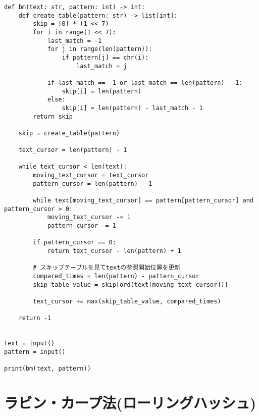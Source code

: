 \documentclass{jlreq}
\begin{document}
\begin{lstlisting}[caption=BM法の実装, frame=TRBL, label={BM}]
def bm(text: str, pattern: int) -> int:
	def create_table(pattern: str) -> list[int]:
		skip = [0] * (1 << 7)
		for i in range(1 << 7):
			last_match = -1
			for j in range(len(pattern)):
				if pattern[j] == chr(i):
					last_match = j
			
			if last_match == -1 or last_match == len(pattern) - 1:
				skip[i] = len(pattern)
			else:
				skip[i] = len(pattern) - last_match - 1
		return skip

	skip = create_table(pattern)

	text_cursor = len(pattern) - 1
	
	while text_cursor < len(text):
		moving_text_cursor = text_cursor
		pattern_cursor = len(pattern) - 1
  
		while text[moving_text_cursor] == pattern[pattern_cursor] and pattern_cursor > 0:
			moving_text_cursor -= 1
			pattern_cursor -= 1
   
		if pattern_cursor == 0:
			return text_cursor - len(pattern) + 1
		
		# スキップテーブルを見てtextの参照開始位置を更新
		compared_times = len(pattern) - pattern_cursor
		skip_table_value = skip[ord(text[moving_text_cursor])]
  
		text_cursor += max(skip_table_value, compared_times)
	
	return -1
  
  
text = input()
pattern = input()

print(bm(text, pattern))

\end{lstlisting}

\newpage

\section{ラビン・カープ法(ローリングハッシュ)}
\end{document}
